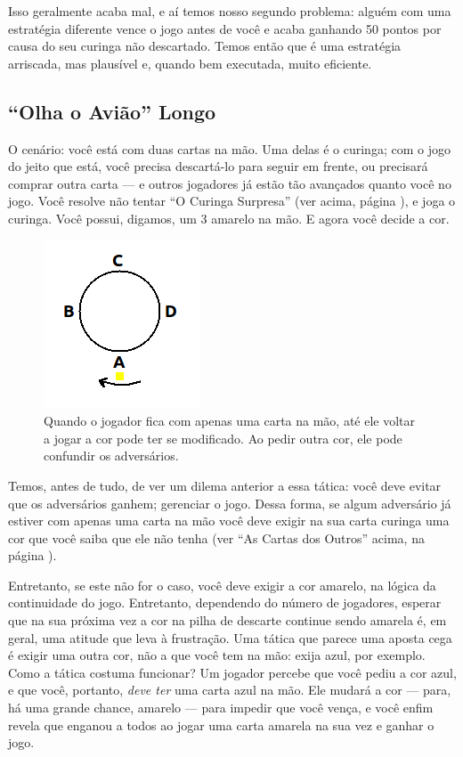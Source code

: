Isso geralmente acaba mal, e aí temos nosso segundo problema: alguém com uma estratégia diferente vence o jogo antes de você e acaba ganhando 50 pontos por causa do seu curinga não descartado. Temos então que é uma estratégia arriscada, mas plausível e, quando bem executada, muito eficiente.

\subsection{``Olha o Avião'' Longo}

\label{aviaolongo}

O cenário: você está com duas cartas na mão. Uma delas é o curinga; com o jogo do jeito que está, você precisa descartá-lo para seguir em frente, ou precisará comprar outra carta --- e outros jogadores já estão tão avançados quanto você no jogo. Você resolve não tentar ``O Curinga Surpresa'' (ver acima, página \pageref{curingasurpresa}), e joga o curinga. Você possui, digamos, um 3 amarelo na mão. E agora você decide a cor.

\begin{figure}
  \begin{center}
    \includegraphics[scale=0.5]{fig3.png}
  \end{center}
  \caption{Quando o jogador fica com apenas uma carta na mão, até ele voltar a jogar a cor pode ter se modificado. Ao pedir outra cor, ele pode confundir os adversários.}
\end{figure}

Temos, antes de tudo, de ver um dilema anterior a essa tática: você deve evitar que os adversários ganhem; gerenciar o jogo. Dessa forma, se algum adversário já estiver com apenas uma carta na mão você deve exigir na sua carta curinga uma cor que você saiba que ele não tenha (ver ``As Cartas dos Outros'' acima, na página \pageref{leituradosjogadorescartas}).

Entretanto, se este não for o caso, você deve exigir a cor amarelo, na lógica da continuidade do jogo. Entretanto, dependendo do número de jogadores, esperar que na sua próxima vez a cor na pilha de descarte continue sendo amarela é, em geral, uma atitude que leva à frustração. Uma tática que parece uma aposta cega é exigir uma outra cor, não a que você tem na mão: exija azul, por exemplo. Como a tática costuma funcionar? Um jogador percebe que você pediu a cor azul, e que você, portanto, \textit{deve ter} uma carta azul na mão. Ele mudará a cor --- para, há uma grande chance, amarelo --- para impedir que você vença, e você enfim revela que enganou a todos ao jogar uma carta amarela na sua vez e ganhar o jogo.

